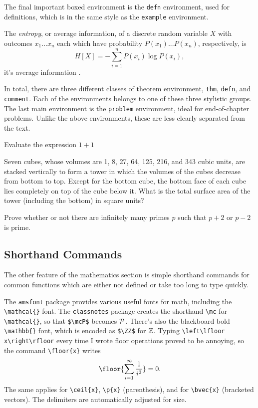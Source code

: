 \documentclass[11pt]{article}
\begin{document}
The final important boxed environment is the \verb|defn| environment, used for definitions, which is in the same style as the \verb|example| environment.
\begin{defn}[Entropy]
	The \textit{entropy}, or average information, of a discrete random variable $X$ with outcomes $x_1...x_n$ each which have probability $P(x_1)...P(x_n)$, respectively, is
	\[H[X] = -\sum_{i=1}^n P(x_i)\log P(x_i),\]
	it's average information \cite{shannon1948}.
\end{defn}
In total, there are three different classes of theorem environment, \verb|thm|, \verb|defn|, and \verb|comment|. Each of the environments belongs to one of these three stylistic groups. The last main environment is the \verb|problem| environment, ideal for end-of-chapter problems. Unlike the above environments, these are less clearly separated from the text.
\begin{problem}
	Evaluate the expression $1 + 1$
\end{problem}
\begin{problem}[AMC 12 \#17]
	Seven cubes, whose volumes are 1, 8, 27, 64, 125, 216, and 343 cubic units, are stacked vertically to form a tower in which the volumes of the cubes decrease from bottom to top. Except for the bottom cube, the bottom face of each cube lies completely on top of the cube below it. What is the total surface area of the tower (including the bottom) in square units?
\end{problem}
\begin{problem}
	Prove whether or not there are infinitely many primes $p$ such that $p + 2$ or $p-2$ is prime.
\end{problem}

\subsection{Shorthand Commands}
The other feature of the mathematics section is simple shorthand commands for common functions which are either not defined or take too long to type quickly.

The \texttt{amsfont} package provides various useful fonts for math, including the \verb|\mathcal{}| font. The \texttt{classnotes} package creates the shorthand \verb|\mc| for \verb|\mathcal{}|, so that \verb|$\mcP$| becomes $\mathcal{P}$. There's also the blackboard bold \verb|\mathbb{}| font, which is encoded as \verb|$\ZZ$| for $\mathbb{Z}$.
Typing \verb|\left\lfloor x\right\rfloor| every time I wrote floor operations proved to be annoying, so the command \verb|\floor{x}| writes
\[\floor{\sum_{i=1}^{\infty} \frac{1}{i^2}} = 0.\]
The same applies for \verb|\ceil{x}|, \verb|\p{x}| (parenthesis), and for \verb|\bvec{x}| (bracketed vectors). The delimiters are automatically adjusted for size.
\end{document}
